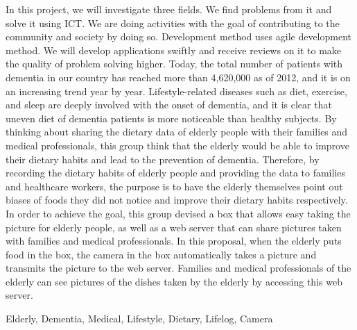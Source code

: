 \documentclass[../report]{subfiles}
\begin{document}
\begin{eabstract}
In this project, we will investigate three fields. We find problems from it and solve it using ICT. We are doing activities with the goal of contributing to the community and society by doing so. Development method uses agile development method. We will develop applications swiftly and receive reviews on it to make the quality of problem solving higher.
Today, the total number of patients with dementia in our country has reached more than 4,620,000 as of 2012, and it is on an increasing trend year by year. Lifestyle-related diseases such as diet, exercise, and sleep are deeply involved with the onset of dementia, and it is clear that uneven diet of dementia patients is more noticeable than healthy subjects. By thinking about sharing the dietary data of elderly people with their families and medical professionals, this group think that the elderly would be able to improve their dietary habits and lead to the prevention of dementia. Therefore, by recording the dietary habits of elderly people and providing the data to families and healthcare workers, the purpose is to have the elderly themselves point out biases of foods they did not notice and improve their dietary habits respectively.
In order to achieve the goal, this group devised a box that allows easy taking the picture for elderly people, as well as a web server that can share pictures taken with families and medical professionals. In this proposal, when the elderly puts food in the box, the camera in the box automatically takes a picture and transmits the picture to the web server. Families and medical professionals of the elderly can see pictures of the dishes taken by the elderly by accessing this web server.
\begin{ekeyword}
Elderly, Dementia, Medical, Lifestyle, Dietary, Lifelog, Camera
\end{ekeyword}
\end{eabstract}
\end{document}
